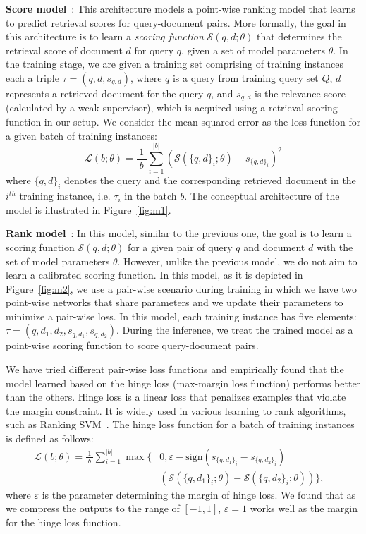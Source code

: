 \documentclass[sigconf]{acmart}
\newcommand{\Modelone}{Score model\xspace}
\newcommand{\Modeltwo}{Rank model\xspace}
\newcommand{\mypar}[1]{\vspace*{-0.1ex}\medskip\noindent\textbf{#1}~}
\begin{document}
\mypar{\Modelone}: This architecture models a point-wise ranking model that learns to predict retrieval scores for query-document pairs. More formally, the goal in this architecture is to learn a \emph{scoring function} $\mathcal{S}(q, d; \theta)$ that determines the retrieval score of document $d$ for query $q$, given a set of model parameters $\theta$.
%
In the training stage, we are given a training set comprising of training instances each a triple $\tau = (q,d, s_{q,d})$, where $q$ is a query from training query set $Q$, $d$ represents a retrieved document for the query $q$, and $s_{q,d}$ is the relevance score (calculated by a weak supervisor), which is acquired using a retrieval scoring function in our setup.
%
We consider the mean squared error as the loss function for a given batch of training instances:
\begin{equation}
\mathcal{L}(b; \theta) = \frac{1}{|b|} \sum_{i=1}^{|b|}{(\mathcal{S}(\{q, d\}_i; \theta) - s_{\{q, d\}_i})^2}
\end{equation}
where $\{q, d\}_i$ denotes the query and the corresponding retrieved document in the $i^{th}$ training instance, i.e. $\tau_i$ in the batch $b$.
The conceptual architecture of the model is illustrated in Figure~\ref{fig:m1}.


\mypar{\Modeltwo}:
In this model, similar to the previous one, the goal is to learn a scoring function $\mathcal{S}(q, d; \theta)$ for a given pair of query $q$ and document $d$ with the set of model parameters $\theta$. 
However, unlike the previous model, we do not aim to learn a calibrated scoring function. 
In this model, as it is depicted in Figure~\ref{fig:m2}, we use a pair-wise scenario during training in which we have two point-wise networks that share parameters and we update their parameters to minimize a pair-wise loss.
In this model, each training instance has five elements: $\tau = (q,d_1, d_2, s_{q,d_1}, s_{q,d_2})$.
During the inference, we treat the trained model as a point-wise scoring function to score query-document pairs.

We have tried different pair-wise loss functions and empirically found that the model learned based on the hinge loss (max-margin loss function) performs better than the others. 
Hinge loss is a linear loss that penalizes examples that violate the margin constraint. It is widely used in various learning to rank algorithms, such as Ranking SVM~\citep{Herbrich:1999}. The hinge loss function for a batch of training instances is defined as follows:
\begin{equation}
\begin{aligned}
\mathcal{L}(b; \theta) = \frac{1}{|b|}
\sum_{i=1}^{|b|}
\max\big\{
& 
0, \varepsilon - \text{sign}
(s_{\{q, d_1\}_i} - s_{\{q, d_2\}_i})
& \\ & 
\left(\mathcal{S}\left(\{q, d_1\}_i; \theta\right) -\mathcal{S}\left(\{q, d_2\}_i; \theta\right)\right)
\big\}
, 
\end{aligned}     
\end{equation}
where $\varepsilon$ is the parameter determining the margin of hinge loss. We found that as we compress the outputs to the range of $[-1, 1]$, $\varepsilon=1$ works well as the margin for the hinge loss function.
\end{document}
